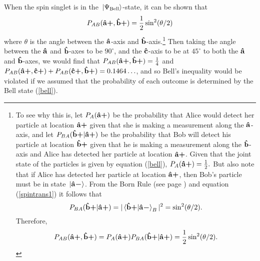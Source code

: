 When the spin singlet is in the $\ket*{\Psi_{\text{Bell}}}$-state, it can be shown that 
      \begin{equation}\label{bellsin}
      P_{AB}({\vb{\hat{{a}}}\bm{+}},{\vb{\hat{{b}}}\bm{+}})=\frac{1}{2}\sin^2(\theta/2)
      \end{equation}
where $\theta$ is the angle between the $\vb{\hat{{a}}}$-axis and $\vb{\hat{{b}}}$-axis.\footnote{To see why this is, let $P_A({\vb{\hat{{a}}}\bm{+}})$ be the probability that Alice would detect her particle at location ${\vb{\hat{{a}}}\bm{+}}$ given that she is making a measurement along the $\vb{\hat{{a}}}$-axis, and let $P_{BA}({\vb{\hat{{b}}}\bm{+}}|{\vb{\hat{{a}}}\bm{+}})$ be the probability that Bob will detect his particle at location ${\vb{\hat{{b}}}\bm{+}}$ given that he is making a measurement along the $\vb{\hat{{b}}}$-axis and Alice has detected her particle at location ${\vb{\hat{{a}}}\bm{+}}$. Given that the joint state of the particles is given by equation (\ref{bell}), $P_A({\vb{\hat{{a}}}\bm{+}})=\frac{1}{2}.$ But also note that if  Alice has detected her particle at location ${\vb{\hat{{a}}}\bm{+}}$, then Bob's particle must be in state $\ket*{{\vb{\hat{{a}}}\bm{-}}}$. From the Born Rule (see page \pageref{bornrule}) and equation (\ref{spintrans1}) it follows that 
      $$P_{BA}(\uvbp{b}|\uvbp{a})= |\ip*{\uvbp{b}}{\uvbm{a}}_B|^2=\sin^2(\theta/2).$$ 
Therefore, 
$$P_{AB}({\vb{\hat{{a}}}\bm{+}},{\vb{\hat{{b}}}\bm{+}})= P_A({\vb{\hat{{a}}}\bm{+}})P_{BA}({\vb{\hat{{b}}}\bm{+}}|{\vb{\hat{{a}}}\bm{+}})=\frac{1}{2}\sin^2(\theta/2).$$} 
Then taking the angle between the $\vb{\hat{{a}}}$ and $\vb{\hat{{b}}}$-axes to be $90^\circ$, and the $\vb{\hat{{c}}}$-axis to be at $45^\circ$ to both the $\vb{\hat{{a}}}$ and $\vb{\hat{{b}}}$-axes, we would find that $P_{AB}({\vb{\hat{{a}}}\bm{+}},{\vb{\hat{{b}}}\bm{+}})=\frac{1}{4}$ and $P_{AB}({\vb{\hat{{a}}}\bm{+}},{\vb{\hat{{c}}}\bm{+}})+P_{AB}({\vb{\hat{{c}}}\bm{+}},{\vb{\hat{{b}}}\bm{+}})=0.1464\ldots$, and so Bell's inequality would be violated if we assumed that the probability of each outcome is determined by the Bell state  (\ref{bell}). 
      